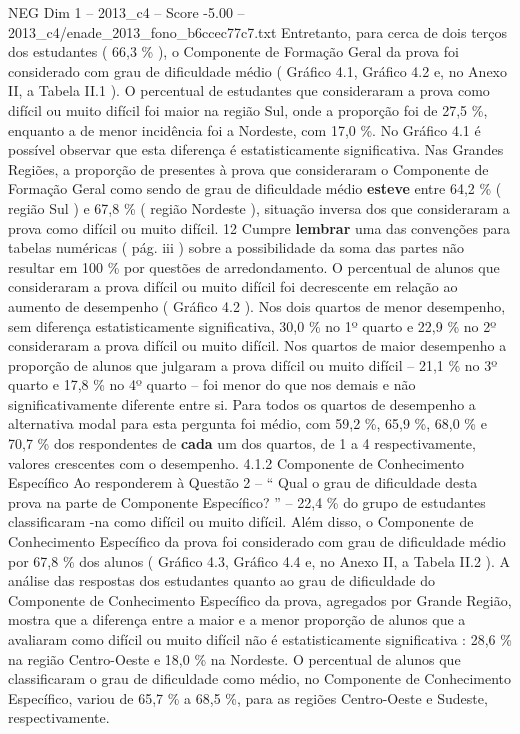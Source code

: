 \begin{textsample}{NEG Dim 1 – 2013\_c4 – Score -5.00 – 2013\_c4/enade\_2013\_fono\_b6ccec77c7.txt}
Entretanto, para cerca de dois terços dos estudantes ( 66,3 \% ), o Componente de Formação Geral da prova foi considerado com grau de dificuldade médio ( Gráfico 4.1, Gráfico 4.2 e, no Anexo II, a Tabela II.1 ).
O percentual de estudantes que consideraram a prova como difícil ou muito difícil foi maior na região Sul, onde a proporção foi de 27,5 \%, enquanto a de menor incidência foi a Nordeste, com 17,0 \%.
No Gráfico 4.1 é possível observar que esta diferença é estatisticamente significativa.
Nas Grandes Regiões, a proporção de presentes à prova que consideraram o Componente de Formação Geral como sendo de grau de dificuldade médio \textbf{esteve} entre 64,2 \% ( região Sul ) e 67,8 \% ( região Nordeste ), situação inversa dos que consideraram a prova como difícil ou muito difícil. 12 Cumpre \textbf{lembrar} uma das convenções para tabelas numéricas ( pág. iii ) sobre a possibilidade da soma das partes não resultar em 100 \% por questões de arredondamento.
O percentual de alunos que consideraram a prova difícil ou muito difícil foi decrescente em relação ao aumento de desempenho ( Gráfico 4.2 ).
Nos dois quartos de menor desempenho, sem diferença estatisticamente significativa, 30,0 \% no 1º quarto e 22,9 \% no 2º consideraram a prova difícil ou muito difícil.
Nos quartos de maior desempenho a proporção de alunos que julgaram a prova difícil ou muito difícil – 21,1 \% no 3º quarto e 17,8 \% no 4º quarto – foi menor do que nos demais e não significativamente diferente entre si.
Para todos os quartos de desempenho a alternativa modal para esta pergunta foi médio, com 59,2 \%, 65,9 \%, 68,0 \% e 70,7 \% dos respondentes de \textbf{cada} um dos quartos, de 1 a 4 respectivamente, valores crescentes com o desempenho. 4.1.2 Componente de Conhecimento Específico Ao responderem à Questão 2 – “ Qual o grau de dificuldade desta prova na parte de Componente Específico? ” – 22,4 \% do grupo de estudantes classificaram -na como difícil ou muito difícil.
Além disso, o Componente de Conhecimento Específico da prova foi considerado com grau de dificuldade médio por 67,8 \% dos alunos ( Gráfico 4.3, Gráfico 4.4 e, no Anexo II, a Tabela II.2 ).
A análise das respostas dos estudantes quanto ao grau de dificuldade do Componente de Conhecimento Específico da prova, agregados por Grande Região, mostra que a diferença entre a maior e a menor proporção de alunos que a avaliaram como difícil ou muito difícil não é estatisticamente significativa : 28,6 \% na região Centro-Oeste e 18,0 \% na Nordeste.
O percentual de alunos que classificaram o grau de dificuldade como médio, no Componente de Conhecimento Específico, variou de 65,7 \% a 68,5 \%, para as regiões Centro-Oeste e Sudeste, respectivamente.

\end{textsample}
